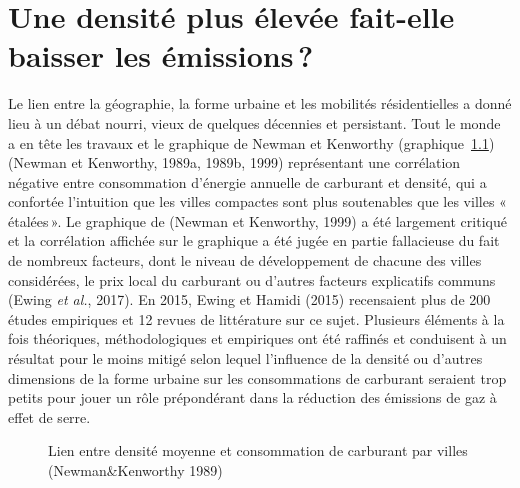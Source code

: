 \documentclass[
  9pt,
  a4paper,
  DIV=11]{scrreprt}
\begin{document}
\chapter{Une densité plus élevée fait-elle baisser les
émissions\,?}\label{sec-densemis}

Le lien entre la géographie, la forme urbaine et les mobilités
résidentielles a donné lieu à un débat nourri, vieux de quelques
décennies et persistant. Tout le monde a en tête les travaux et le
graphique de Newman et Kenworthy (graphique~\ref{fig-newmankenworthy})
(Newman et Kenworthy, 1989a, 1989b, 1999) représentant une corrélation
négative entre consommation d'énergie annuelle de carburant et densité,
qui a confortée l'intuition que les villes compactes sont plus
soutenables que les villes «\,étalées\,». Le graphique de (Newman et
Kenworthy, 1999) a été largement critiqué et la corrélation affichée sur
le graphique a été jugée en partie fallacieuse du fait de nombreux
facteurs, dont le niveau de développement de chacune des villes
considérées, le prix local du carburant ou d'autres facteurs explicatifs
communs (Ewing \emph{et al.}, 2017). En 2015, Ewing et Hamidi (2015)
recensaient plus de 200 études empiriques et 12 revues de littérature
sur ce sujet. Plusieurs éléments à la fois théoriques, méthodologiques
et empiriques ont été raffinés et conduisent à un résultat pour le moins
mitigé selon lequel l'influence de la densité ou d'autres dimensions de
la forme urbaine sur les consommations de carburant seraient trop petits
pour jouer un rôle prépondérant dans la réduction des émissions de gaz à
effet de serre.

\begin{figure}

\caption{\label{fig-newmankenworthy}Lien entre densité moyenne et
consommation de carburant par villes (Newman\&Kenworthy 1989)}


\end{figure}%
\end{document}
